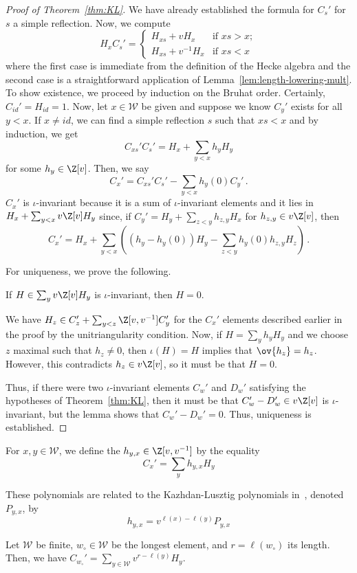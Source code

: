 \documentclass[11pt,leqno,oneside]{amsart}
\numberwithin{thm}{section}
\renewcommand{\W}{\mathcal{W}}
\begin{document}
\begin{proof}[Proof of Theorem~\ref{thm:KL}]
  We have already established the formula for \(C_s'\) for \(s\) a
  simple reflection. Now, we compute \[
    H_x C_s' =
    \begin{cases}
      H_{xs} + vH_x & \text{if } xs > x;\\
      H_{xs} + v^{-1} H_x & \text{if } xs < x
    \end{cases}
  \]
  where the first case is immediate from the definition of the Hecke
  algebra and the second case is a straightforward application
  of Lemma~\ref{lem:length-lowering-mult}. 
  To show existence, we proceed by induction on
  the Bruhat order. Certainly, \(C_{id}' = H_{id} = 1\). Now, let \(x
  \in \W\) be 
  given and suppose we know \(C_y'\) exists for all \(y < x\). If
  \(x \neq id\), we can find a simple reflection \(s\) such that \(xs
  < x\) and by induction, we get \[
    C_{xs}' C_s' = H_x + \sum_{y < x} h_y H_y
  \]
  for some \(h_y \in \Z[v]\). Then, we say \[
    C_x' = C_{xs}' C_s' - \sum_{y < x} h_y(0) C_y' \,.
  \]
  \(C_x'\) is \(\iota\)-invariant because it is a sum of
  \(\iota\)-invariant elements and it lies in \(H_x + \sum_{y <
    x}v\Z[v] H_y \) since, if \(C_y' = H_y + \sum_{z < y} h_{z,y} H_x\) for
  \(h_{z,y} \in v\Z[v]\),
  then \[
    C_x' = H_x + \sum_{y < x} \left( (h_y - h_y(0)) H_y - \sum_{z<y}
      h_y(0) h_{z,y} H_z \right) \,. 
  \]

  For uniqueness, we prove the following.
  \begin{lem}
    If \(H \in \sum_y v \Z[v] H_y\) is \(\iota\)-invariant, then \(H =
    0\). 
  \end{lem}
  We have \(H_z \in C_z' + \sum_{y < z}\Z[v,v^{-1}] C_y'\) for the
  \(C_x'\) elements described earlier in the proof by the
  unitriangularity condition. Now, if \(H = \sum_y h_y H_y\) and we
  choose \(z\) maximal such that \(h_z \neq 0\), then \(\iota(H) = H\)
  implies that \(\ov{h_z} = h_z\). However, this contradicts \(h_z \in
  v\Z[v]\), so it must be that \(H = 0\).

  Thus, if there were two \(\iota\)-invariant elements \(C_w'\) and
  \(D_w'\) satisfying the hypotheses of Theorem~\ref{thm:KL}, then it must be
  that \(C_w'-D_w' \in v \Z[v]\) is \(\iota\)-invariant, but the lemma
  shows that \(C_w'-D_w' = 0\). Thus, uniqueness is established.
\end{proof}
\begin{defn}
  For \(x,y \in \W\), we define the 
  \(h_{y,x} \in \Z[v,v^{-1}]\) by the 
  equality \[
    C_x' = \sum_y h_{y,x} H_y
  \]
\end{defn}
\begin{rmk}
  These polynomials are related to the Kazhdan-Lusztig polynomials
  in~\cite{kl}, denoted \(P_{y,x}\), by \[
    h_{y,x} = v^{\ell(x)-\ell(y)} P_{y,x}
  \]
\end{rmk}
\begin{prop}
  Let \(\W\) be finite, \(w_\circ \in \W\) be the longest element, and
  \(r = \ell(w_\circ)\) its length. Then, we have \(C_{w_\circ}' = \sum_{y \in \W}
  v^{r-\ell(y)} H_y\).
\end{prop}
\end{document}
